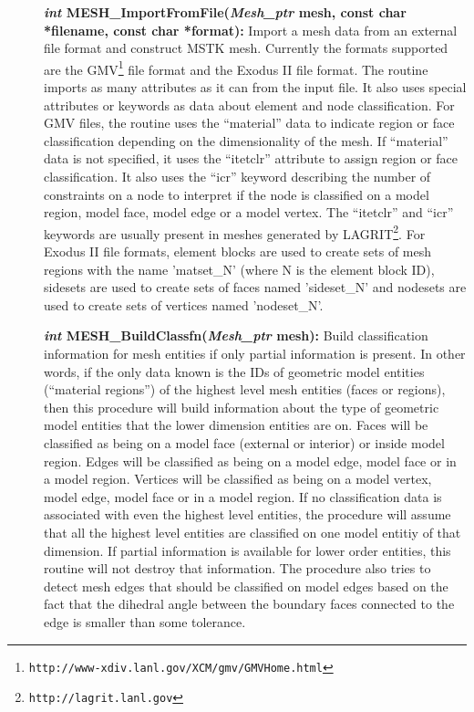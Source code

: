 \documentclass[12pt]{article}
\begin{document}
\begin{description}
\item[]{\bf {\em int} MESH\_ImportFromFile({\em Mesh\_ptr} mesh, const
    char *filename, const char *format):} Import a mesh data from an
  external file format and construct MSTK mesh. Currently the formats
  supported are the
  GMV\footnote{\texttt{http://www-xdiv.lanl.gov/XCM/gmv/GMVHome.html}}
  file format and the Exodus II file format. The routine imports as
  many attributes as it can from the input file. It also uses special
  attributes or keywords as data about element and node
  classification.  For GMV files, the routine uses the ``material''
  data to indicate region or face classification depending on the
  dimensionality of the mesh. If ``material'' data is not specified,
  it uses the ``itetclr'' attribute to assign region or face
  classification. It also uses the ``icr'' keyword describing the
  number of constraints on a node to interpret if the node is
  classified on a model region, model face, model edge or a model
  vertex. The ``itetclr'' and ``icr'' keywords are usually present in
  meshes generated by
  LAGRIT\footnote{\texttt{http://lagrit.lanl.gov}}. For Exodus II file
  formats, element blocks are used to create sets of mesh regions with
  the name 'matset\_N' (where N is the element block ID), sidesets are
  used to create sets of faces named 'sideset\_N' and nodesets are used
  to create sets of vertices named 'nodeset\_N'.

  
\item[]{\bf {\em int} MESH\_BuildClassfn({\em Mesh\_ptr} mesh):} Build
  classification information for mesh entities if only partial
  information is present. In other words, if the only data known is
  the IDs of geometric model entities (``material regions'') of the
  highest level mesh entities (faces or regions), then this procedure
  will build information about the type of geometric model entities
  that the lower dimension entities are on. Faces will be classified
  as being on a model face (external or interior) or inside model
  region. Edges will be classified as being on a model edge, model
  face or in a model region. Vertices will be classified as being on a
  model vertex, model edge, model face or in a model region. If no
  classification data is associated with even the highest level
  entities, the procedure will assume that all the highest level
  entities are classified on one model entitiy of that dimension. If
  partial information is available for lower order entities, this
  routine will not destroy that information. The procedure also tries
  to detect mesh edges that should be classified on model edges based
  on the fact that the dihedral angle between the boundary faces
  connected to the edge is smaller than some tolerance.




\end{description}
\end{document}
